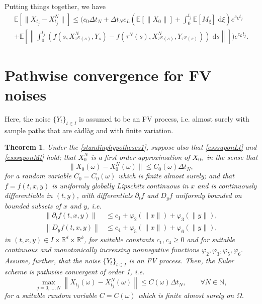 \documentclass[reqno,12pt]{amsart}
\theoremstyle{plain} %
\newtheorem{theorem}{Theorem}[section]
\theoremstyle{definition} %
\begin{document}
Putting things together, we have
\begin{multline}
    \label{expectedestimateglobalerrorintegralold}
        \mathbb{E} \left[\|X_{t_j} - X_{t_j}^N\|\right] \leq \Bigg( c_0 \Delta t_N + \Delta t_N c_L \left(\mathbb{E}[\|X_0\|] + \int_0^{t_j} \mathbb{E}[M_\xi]\;\mathrm{d}\xi\right)e^{c_L t_j} \\
        + \mathbb{E}\left[\left\|\int_0^{t_j} \left( f(s, X_{\tau^N(s)}^N, Y_s) - f(\tau^N(s), X_{\tau^N(s)}^N, Y_{\tau^N(s)}) \right)\;\mathrm{d}s\right\|\right]\Bigg) e^{c_L t_j}.
\end{multline}

\section{Pathwise convergence for FV noises}
\label{secmonotonicbound}

Here, the noise $\{Y_t\}_{t\in I}$ is assumed to be an FV process, i.e. almost surely with sample paths that are c\`adl\`ag and with finite variation.

\begin{theorem}
    \label{thmcadlagfv}
    Under the \cref{standinghypotheses1}, suppose also that \eqref{esssuponLt} and \eqref{esssuponMt} hold; that $X_0^N$ is a first order approximation of $X_0,$ in the sense that
    \begin{equation}
        \label{X0conv}
        \|X_0(\omega) - X_0^N(\omega)\| \leq C_0(\omega)\Delta t_N,
    \end{equation}
    for a random variable $C_0=C_0(\omega)$ which is finite almost surely; and that $f=f(t, x, y)$ is uniformly globally Lipschitz continuous in $x$ and is continuously differentiable in $(t, y)$, with differentials $\partial_t f$ and $D_y f$ uniformly bounded on bounded subsets of $x$ and $y$, i.e.
    \begin{align}
        \label{ftfyboundedgrowthcadlagfpartialt}
        \left\|\partial_t f(t, x, y)\right\| & \leq c_1 + \varphi_2(\|x\|) + \varphi_3(\|y\|), \\
        \label{ftfyboundedgrowthcadlagfpartialy}
        \left\|D_y f(t, x, y)\right\| & \leq c_4 + \varphi_5(\|x\|) + \varphi_6(\|y\|),
    \end{align}
    in $(t, x, y)\in I\times \mathbb{R}^d\times \mathbb{R}^k$, for suitable constants $c_1, c_4 \geq 0$ and for suitable continuous and monotonically increasing nonnegative functions $\varphi_2, \varphi_3, \varphi_5, \varphi_6.$ Assume, further, that the noise $\{Y_t\}_{t\in I}$ is an FV process. Then, the Euler scheme is pathwise convergent of order 1, i.e.
    \begin{equation}
        \label{ordercadlagfv}
        \max_{j=0, \ldots, N} \left\| X_{t_j}(\omega) - X_{t_j}^N(\omega) \right\| \leq C(\omega) \Delta t_N, \qquad \forall N \in \mathbb{N},
    \end{equation}
    for a suitable random variable $C=C(\omega)$ which is finite almost surely on $\Omega.$
\end{theorem}
\end{document}
